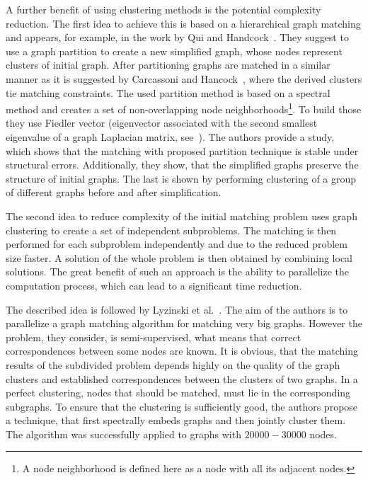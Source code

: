 A further benefit of using clustering methods is the potential complexity reduction. 
The first idea to achieve this is based on a hierarchical graph matching and appears, for example, in the work by Qui and Handcock~\cite{Hancock_GM_SpectralPart}. They suggest to use a graph partition to create a new simplified graph, whose nodes represent clusters of initial graph. After partitioning graphs are matched in a similar manner as it is suggested by Carcassoni and Hancock~\cite{Hancock_ModalClusters}, where the derived clusters tie matching constraints. The used partition method is based on a spectral method and creates a set of non-overlapping node neighborhoods\footnote{A node neighborhood is defined here as a node with all its adjacent nodes.}. To build those they use Fiedler vector (eigenvector associated with the second smallest eigenvalue of a graph Laplacian matrix, see~\cite{Fiedler1975}). The authors provide a study, which shows that the matching with proposed partition technique is stable under structural errors. Additionally, they show, that the simplified graphs preserve the structure of initial graphs. The last is shown by performing clustering of a group of different graphs before and after simplification.

The second idea to reduce complexity of the initial matching problem uses graph clustering to create a set of independent subproblems. The matching is then performed for each subproblem independently and due to the reduced problem size faster. A solution of the whole problem is then obtained by combining local solutions. The great benefit of such an approach is the ability to parallelize the computation process, which can lead to a significant time reduction.

The described idea is followed by Lyzinski et al.~\cite{Lyzinski2015}. The aim of the authors is to parallelize a graph matching algorithm for matching very big graphs. However the problem, they consider, is semi-supervised, what means that correct correspondences between some nodes are known. It is obvious, that the matching results of the subdivided problem depends highly on the quality of the graph clusters and established correspondences between the clusters of two graphs. In a perfect clustering, nodes that should be matched, must lie in the corresponding subgraphs. To ensure that the clustering is sufficiently good, the authors propose a technique, that first spectrally embeds graphs and then jointly cluster them. The algorithm was successfully applied to graphs with $20000-30000$ nodes.

